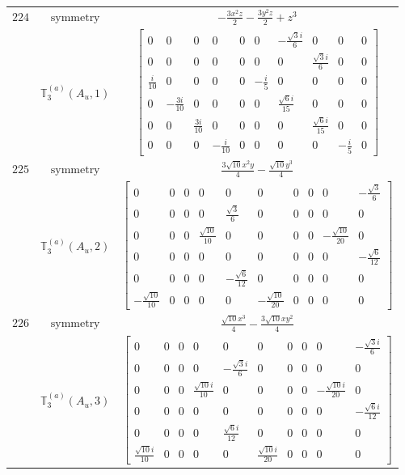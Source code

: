 \documentclass[fleqn,8pt,landscape]{jsarticle}
\begin{document}
\begin{longtable}{ccc}
$ 224 $ & $ \text{symmetry} $ & $ - \frac{3 x^{2} z}{2} - \frac{3 y^{2} z}{2} + z^{3} $ \\
$  $ & $ \mathbb{T}_{3}^{(a)}(A_{u},1) $ & $ \begin{bmatrix} 0 & 0 & 0 & 0 & 0 & 0 & - \frac{\sqrt{3} i}{6} & 0 & 0 & 0 \\ 0 & 0 & 0 & 0 & 0 & 0 & 0 & \frac{\sqrt{3} i}{6} & 0 & 0 \\ \frac{i}{10} & 0 & 0 & 0 & 0 & - \frac{i}{5} & 0 & 0 & 0 & 0 \\ 0 & - \frac{3 i}{10} & 0 & 0 & 0 & 0 & \frac{\sqrt{6} i}{15} & 0 & 0 & 0 \\ 0 & 0 & \frac{3 i}{10} & 0 & 0 & 0 & 0 & \frac{\sqrt{6} i}{15} & 0 & 0 \\ 0 & 0 & 0 & - \frac{i}{10} & 0 & 0 & 0 & 0 & - \frac{i}{5} & 0 \end{bmatrix} $ \\ \hline
$ 225 $ & $ \text{symmetry} $ & $ \frac{3 \sqrt{10} x^{2} y}{4} - \frac{\sqrt{10} y^{3}}{4} $ \\
$  $ & $ \mathbb{T}_{3}^{(a)}(A_{u},2) $ & $ \begin{bmatrix} 0 & 0 & 0 & 0 & 0 & 0 & 0 & 0 & 0 & - \frac{\sqrt{3}}{6} \\ 0 & 0 & 0 & 0 & \frac{\sqrt{3}}{6} & 0 & 0 & 0 & 0 & 0 \\ 0 & 0 & 0 & \frac{\sqrt{10}}{10} & 0 & 0 & 0 & 0 & - \frac{\sqrt{10}}{20} & 0 \\ 0 & 0 & 0 & 0 & 0 & 0 & 0 & 0 & 0 & - \frac{\sqrt{6}}{12} \\ 0 & 0 & 0 & 0 & - \frac{\sqrt{6}}{12} & 0 & 0 & 0 & 0 & 0 \\ - \frac{\sqrt{10}}{10} & 0 & 0 & 0 & 0 & - \frac{\sqrt{10}}{20} & 0 & 0 & 0 & 0 \end{bmatrix} $ \\ \hline
$ 226 $ & $ \text{symmetry} $ & $ \frac{\sqrt{10} x^{3}}{4} - \frac{3 \sqrt{10} x y^{2}}{4} $ \\
$  $ & $ \mathbb{T}_{3}^{(a)}(A_{u},3) $ & $ \begin{bmatrix} 0 & 0 & 0 & 0 & 0 & 0 & 0 & 0 & 0 & - \frac{\sqrt{3} i}{6} \\ 0 & 0 & 0 & 0 & - \frac{\sqrt{3} i}{6} & 0 & 0 & 0 & 0 & 0 \\ 0 & 0 & 0 & \frac{\sqrt{10} i}{10} & 0 & 0 & 0 & 0 & - \frac{\sqrt{10} i}{20} & 0 \\ 0 & 0 & 0 & 0 & 0 & 0 & 0 & 0 & 0 & - \frac{\sqrt{6} i}{12} \\ 0 & 0 & 0 & 0 & \frac{\sqrt{6} i}{12} & 0 & 0 & 0 & 0 & 0 \\ \frac{\sqrt{10} i}{10} & 0 & 0 & 0 & 0 & \frac{\sqrt{10} i}{20} & 0 & 0 & 0 & 0 \end{bmatrix} $ \\ \hline

\end{longtable}
\end{document}
